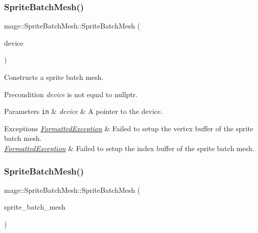 \subsubsection{\texorpdfstring{Sprite\+Batch\+Mesh()}{SpriteBatchMesh()}\hspace{0.1cm}{\footnotesize\ttfamily [2/4]}}
{\footnotesize\ttfamily mage\+::\+Sprite\+Batch\+Mesh\+::\+Sprite\+Batch\+Mesh (\begin{DoxyParamCaption}\item[{I\+D3\+D11\+Device5 $\ast$}]{device }\end{DoxyParamCaption})\hspace{0.3cm}{\ttfamily [explicit]}}

Constructs a sprite batch mesh.

\begin{DoxyPrecond}{Precondition}
{\itshape device} is not equal to {\ttfamily nullptr}. 
\end{DoxyPrecond}

\begin{DoxyParams}[1]{Parameters}
\mbox{\tt in}  & {\em device} & A pointer to the device. \\
\hline
\end{DoxyParams}

\begin{DoxyExceptions}{Exceptions}
{\em \hyperlink{classmage_1_1_formatted_exception}{Formatted\+Exception}} & Failed to setup the vertex buffer of the sprite batch mesh. \\
\hline
{\em \hyperlink{classmage_1_1_formatted_exception}{Formatted\+Exception}} & Failed to setup the index buffer of the sprite batch mesh. \\
\hline
\end{DoxyExceptions}
\hypertarget{classmage_1_1_sprite_batch_mesh_af86adf72834bd4a8b5b55af3e91bd339}{}\label{classmage_1_1_sprite_batch_mesh_af86adf72834bd4a8b5b55af3e91bd339} 
\subsubsection{\texorpdfstring{Sprite\+Batch\+Mesh()}{SpriteBatchMesh()}\hspace{0.1cm}{\footnotesize\ttfamily [3/4]}}
{\footnotesize\ttfamily mage\+::\+Sprite\+Batch\+Mesh\+::\+Sprite\+Batch\+Mesh (\begin{DoxyParamCaption}\item[{const \hyperlink{classmage_1_1_sprite_batch_mesh}{Sprite\+Batch\+Mesh} \&}]{sprite\+\_\+batch\+\_\+mesh }\end{DoxyParamCaption})\hspace{0.3cm}{\ttfamily [delete]}}

